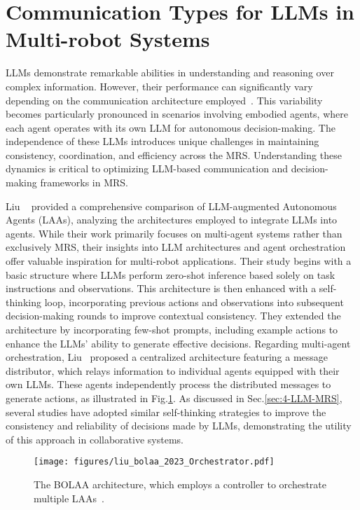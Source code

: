 \section{Communication Types for LLMs in Multi-robot Systems}\label{sec:3-comm}


LLMs demonstrate remarkable abilities in understanding and reasoning over complex information. However, their performance can significantly vary depending on the communication architecture employed~\cite{chen_scalable_2024, liu_bolaa_2023}. This variability becomes particularly pronounced in scenarios involving embodied agents, where each agent operates with its own LLM for autonomous decision-making. The independence of these LLMs introduces unique challenges in maintaining consistency, coordination, and efficiency across the MRS. Understanding these dynamics is critical to optimizing LLM-based communication and decision-making frameworks in MRS.

Liu \etal~\cite{liu_bolaa_2023} provided a comprehensive comparison of LLM-augmented Autonomous Agents (LAAs), analyzing the architectures employed to integrate LLMs into agents. While their work primarily focuses on multi-agent systems rather than exclusively MRS, their insights into LLM architectures and agent orchestration offer valuable inspiration for multi-robot applications. Their study begins with a basic structure where LLMs perform zero-shot inference based solely on task instructions and observations. This architecture is then enhanced with a self-thinking loop, incorporating previous actions and observations into subsequent decision-making rounds to improve contextual consistency. They extended the architecture by incorporating few-shot prompts, including example actions to enhance the LLMs' ability to generate effective decisions.
Regarding multi-agent orchestration, Liu \etal ~proposed a centralized architecture featuring a message distributor, which relays information to individual agents equipped with their own LLMs. These agents independently process the distributed messages to generate actions, as illustrated in Fig.\ref{fig:bolaa_sec3}. As discussed in Sec.\ref{sec:4-LLM-MRS}, several studies have adopted similar self-thinking strategies to improve the consistency and reliability of decisions made by LLMs, demonstrating the utility of this approach in collaborative systems.
\begin{figure}[htbp]
    \centering
    \texttt{[image: figures/liu\_bolaa\_2023\_Orchestrator.pdf]}
    \caption{The BOLAA architecture, which employs a controller to orchestrate multiple LAAs~\cite{liu_bolaa_2023}.}
    \label{fig:bolaa_sec3}
\end{figure}

